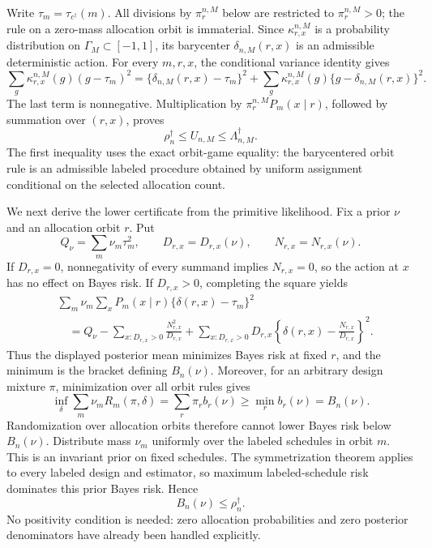 Write \(\tau_m=\tau_{c^\dagger}(m)\).  All divisions by \(\pi_r^{n,M}\) below are restricted to \(\pi_r^{n,M}>0\); the rule on a zero-mass allocation orbit is immaterial.  Since \(\kappa_{r,x}^{n,M}\) is a probability distribution on \(\Gamma_M\subset[-1,1]\), its barycenter \(\delta_{n,M}(r,x)\) is an admissible deterministic action.  For every \(m,r,x\), the conditional variance identity gives
\[
 \sum_g\kappa_{r,x}^{n,M}(g)(g-\tau_m)^2
 =\{\delta_{n,M}(r,x)-\tau_m\}^2
 +\sum_g\kappa_{r,x}^{n,M}(g)
 \{g-\delta_{n,M}(r,x)\}^2.
\]
The last term is nonnegative.  Multiplication by \(\pi_r^{n,M}P_m(x\mid r)\), followed by summation over \((r,x)\), proves
\[
 \rho_n^\dagger\leq U_{n,M}\leq\Lambda_{n,M}^\dagger.
\]
The first inequality uses the exact orbit-game equality: the barycentered orbit rule is an admissible labeled procedure obtained by uniform assignment conditional on the selected allocation count.

We next derive the lower certificate from the primitive likelihood.  Fix a prior \(\nu\) and an allocation orbit \(r\).  Put
\[
 Q_\nu=\sum_m\nu_m\tau_m^2,
 \qquad D_{r,x}=D_{r,x}(\nu),
 \qquad N_{r,x}=N_{r,x}(\nu).
\]
If \(D_{r,x}=0\), nonnegativity of every summand implies \(N_{r,x}=0\), so the action at \(x\) has no effect on Bayes risk.  If \(D_{r,x}>0\), completing the square yields
\[
 \begin{aligned}
 &\sum_m\nu_m\sum_xP_m(x\mid r)\{\delta(r,x)-\tau_m\}^2\\
 &\quad=Q_\nu-
 \sum_{x:D_{r,x}>0}\frac{N_{r,x}^2}{D_{r,x}}
 +\sum_{x:D_{r,x}>0}D_{r,x}
 \left\{\delta(r,x)-\frac{N_{r,x}}{D_{r,x}}\right\}^2.
 \end{aligned}
\]
Thus the displayed posterior mean minimizes Bayes risk at fixed \(r\), and the minimum is the bracket defining \(B_n(\nu)\).  Moreover, for an arbitrary design mixture \(\pi\), minimization over all orbit rules gives
\[
 \inf_\delta\sum_m\nu_mR_m(\pi,\delta)
 =\sum_r\pi_rb_r(\nu)\geq\min_rb_r(\nu)=B_n(\nu).
\]
Randomization over allocation orbits therefore cannot lower Bayes risk below \(B_n(\nu)\).  Distribute mass \(\nu_m\) uniformly over the labeled schedules in orbit \(m\).  This is an invariant prior on fixed schedules.  The symmetrization theorem applies to every labeled design and estimator, so maximum labeled-schedule risk dominates this prior Bayes risk.  Hence
\[
 B_n(\nu)\leq\rho_n^\dagger.
\]
No positivity condition is needed: zero allocation probabilities and zero posterior denominators have already been handled explicitly.

